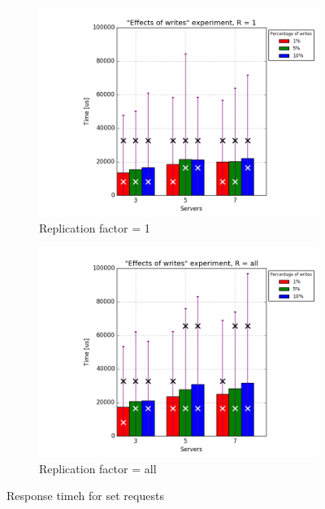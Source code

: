\documentclass[11pt]{article}
\begin{document}
\begin{figure}
\centering
\begin{subfigure}{.5\textwidth}
	\centering
	\includegraphics[width=\linewidth]{plots/writes-response_time-set-1-replication}
	\caption{Replication factor = 1}
	\label{fig:writes-set-1}
\end{subfigure}%
\begin{subfigure}{.5\textwidth}
	\centering
	\includegraphics[width=\linewidth]{plots/writes-response_time-set-2-replication}
	\caption{Replication factor = all}
	\label{fig:writes-set-2}
\end{subfigure}
\caption{Response timeh for set requests}
\label{fig:writes-response-time-set}
\end{figure}
\end{document}
